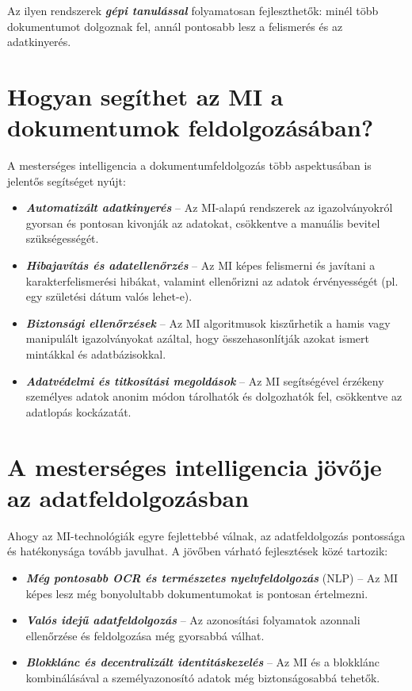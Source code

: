 \documentclass[
]{thesis-ekf}
\theoremstyle{definition}
\theoremstyle{remark}
\begin{document}
	Az ilyen rendszerek \textbf{\emph{gépi tanulással}} folyamatosan fejleszthetők: minél több dokumentumot dolgoznak fel, annál pontosabb lesz a felismerés és az adatkinyerés.
	
	\section{Hogyan segíthet az MI a dokumentumok feldolgozásában?}
	A mesterséges intelligencia a dokumentumfeldolgozás több aspektusában is jelentős segítséget nyújt: \begin{itemize} \item \textbf{\emph{Automatizált adatkinyerés}} -- Az MI-alapú rendszerek az igazolványokról gyorsan és pontosan kivonják az adatokat, csökkentve a manuális bevitel szükségességét. \item \textbf{\emph{Hibajavítás és adatellenőrzés}} -- Az MI képes felismerni és javítani a karakterfelismerési hibákat, valamint ellenőrizni az adatok érvényességét (pl. egy születési dátum valós lehet-e). \item \textbf{\emph{Biztonsági ellenőrzések}} -- Az MI algoritmusok kiszűrhetik a hamis vagy manipulált igazolványokat azáltal, hogy összehasonlítják azokat ismert mintákkal és adatbázisokkal. \item \textbf{\emph{Adatvédelmi és titkosítási megoldások}} -- Az MI segítségével érzékeny személyes adatok anonim módon tárolhatók és dolgozhatók fel, csökkentve az adatlopás kockázatát. \end{itemize}
	
	\section{A mesterséges intelligencia jövője az adatfeldolgozásban}
	Ahogy az MI-technológiák egyre fejlettebbé válnak, az adatfeldolgozás pontossága és hatékonysága tovább javulhat. A jövőben várható fejlesztések közé tartozik: \begin{itemize} \item \textbf{\emph{Még pontosabb OCR és természetes nyelvfeldolgozás}} (NLP) -- Az MI képes lesz még bonyolultabb dokumentumokat is pontosan értelmezni. \item \textbf{\emph{Valós idejű adatfeldolgozás}} -- Az azonosítási folyamatok azonnali ellenőrzése és feldolgozása még gyorsabbá válhat. \item \textbf{\emph{Blokklánc és decentralizált identitáskezelés}} -- Az MI és a blokklánc kombinálásával a személyazonosító adatok még biztonságosabbá tehetők. \end{itemize}
	
\end{document}
